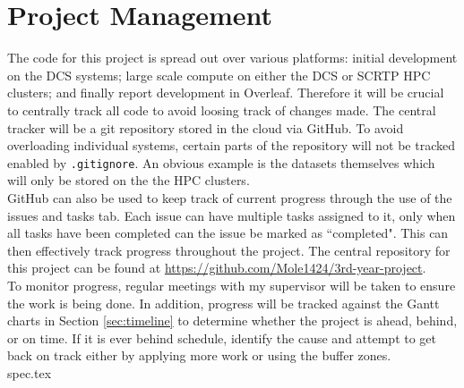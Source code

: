 \documentclass{article}
\begin{document}
\section{Project Management}

The code for this project is spread out over various platforms: initial development on the DCS systems; large scale compute on either the DCS or SCRTP HPC clusters; and finally report development in Overleaf. Therefore it will be crucial to centrally track all code to avoid loosing track of changes made. The central tracker will be a git repository stored in the cloud via GitHub. To avoid overloading individual systems, certain parts of the repository will not be tracked enabled by \verb|.gitignore|. An obvious example is the datasets themselves which will only be stored on the the HPC clusters.\\

GitHub can also be used to keep track of current progress through the use of the issues and tasks tab. Each issue can have multiple tasks assigned to it, only when all tasks have been completed can the issue be marked as ``completed". This can then effectively track progress throughout the project. The central repository for this project can be found at \url{https://github.com/Mole1424/3rd-year-project}.\\

To monitor progress, regular meetings with my supervisor will be taken to ensure the work is being done. In addition, progress will be tracked against the Gantt charts in Section \ref{sec:timeline} to determine whether the project is ahead, behind, or on time. If it is ever behind schedule, identify the cause and attempt to get back on track either by applying more work or using the buffer zones.\\




\newpage
\appendix
{spec.tex}
\end{document}
